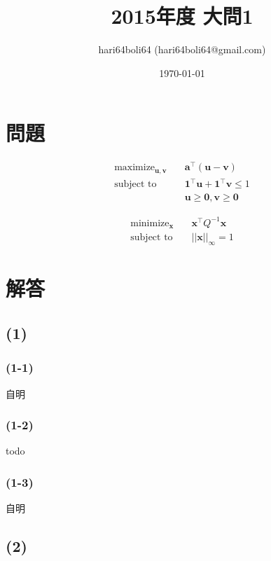 \documentclass[a4paper, 10pt, dvipdfmx]{jlreq}
\begin{document}
\title{2015年度 大問1}
\author{hari64boli64 (hari64boli64@gmail.com)}
\date{\today}
\maketitle

\section{問題}

\begin{align*}
  \text{maximize}_{\bm{u},\bm{v}} \quad & \bm{a}^\top (\bm{u}-\bm{v})                  \\
  \text{subject to} \quad               & \bm{1}^\top \bm{u}+\bm{1}^\top \bm{v} \leq 1 \\
                                        & \bm{u}\geq \bm{0},\bm{v}\geq \bm{0}
\end{align*}


\begin{align*}
  \text{minimize}_{\bm{x}} \quad & \bm{x}^\top Q^{-1}\bm{x} \\
  \text{subject to} \quad        & ||\bm{x}||_{\infty} = 1
\end{align*}

\section{解答}

\subsection*{(1)}

\subsubsection*{(1-1)}

自明

\subsubsection*{(1-2)}

todo

\subsubsection*{(1-3)}

自明

\subsection*{(2)}
\end{document}
